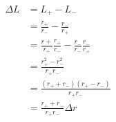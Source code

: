 \begin{eqnarray}\label{eqn:net-likelihood}
\Delta L & = L_+ - L_- \\
& = \frac{r_+}{r_-} - \frac{r_-}{r_+} \\
& =  \frac{r+}{r_+}\frac{r_+}{r_-} - \frac{r_-}{r_-}\frac{r_-}{r_+} \\
& =  \frac{r_+^2 - r_-^2}{r_+r_-} \\
& =  \frac{(r_+ + r_-)(r_+ - r_-)}{r_+r_-} \\
& =  \frac{r_+ + r_-}{r_+r_-}\Delta r \\
\
\end{eqnarray}